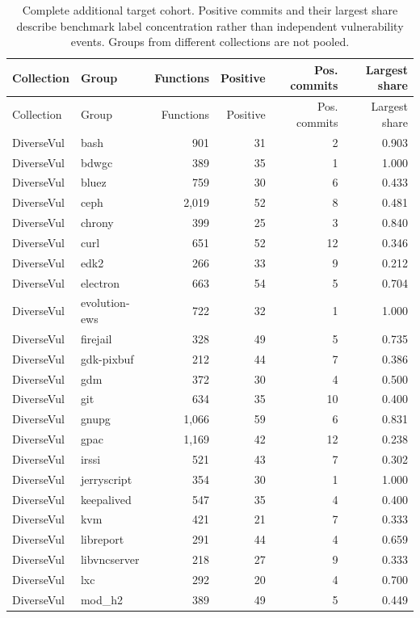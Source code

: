 \begin{longtable}{@{}llrrrr@{}}
\caption{Complete additional target cohort. Positive commits and their largest share describe benchmark label concentration rather than independent vulnerability events. Groups from different collections are not pooled.}\label{si:newcounts}\\
\toprule Collection & Group & Functions & Positive & Pos. commits & Largest share\\\midrule\endfirsthead
\toprule Collection & Group & Functions & Positive & Pos. commits & Largest share\\\midrule\endhead
\bottomrule\endfoot
DiverseVul & bash & 901 & 31 & 2 & 0.903\\
DiverseVul & bdwgc & 389 & 35 & 1 & 1.000\\
DiverseVul & bluez & 759 & 30 & 6 & 0.433\\
DiverseVul & ceph & 2,019 & 52 & 8 & 0.481\\
DiverseVul & chrony & 399 & 25 & 3 & 0.840\\
DiverseVul & curl & 651 & 52 & 12 & 0.346\\
DiverseVul & edk2 & 266 & 33 & 9 & 0.212\\
DiverseVul & electron & 663 & 54 & 5 & 0.704\\
DiverseVul & evolution-ews & 722 & 32 & 1 & 1.000\\
DiverseVul & firejail & 328 & 49 & 5 & 0.735\\
DiverseVul & gdk-pixbuf & 212 & 44 & 7 & 0.386\\
DiverseVul & gdm & 372 & 30 & 4 & 0.500\\
DiverseVul & git & 634 & 35 & 10 & 0.400\\
DiverseVul & gnupg & 1,066 & 59 & 6 & 0.831\\
DiverseVul & gpac & 1,169 & 42 & 12 & 0.238\\
DiverseVul & irssi & 521 & 43 & 7 & 0.302\\
DiverseVul & jerryscript & 354 & 30 & 1 & 1.000\\
DiverseVul & keepalived & 547 & 35 & 4 & 0.400\\
DiverseVul & kvm & 421 & 21 & 7 & 0.333\\
DiverseVul & libreport & 291 & 44 & 4 & 0.659\\
DiverseVul & libvncserver & 218 & 27 & 9 & 0.333\\
DiverseVul & lxc & 292 & 20 & 4 & 0.700\\
DiverseVul & mod\_h2 & 389 & 49 & 5 & 0.449\\

\end{longtable}
